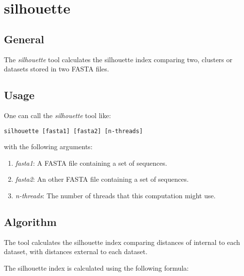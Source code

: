 \section{silhouette}

\subsection{General}

The \emph{silhouette} tool calculates the silhouette index comparing two,
clusters or datasets stored in two FASTA files.

\subsection{Usage}

One can call the \emph{silhouette} tool like:
\begin{lstlisting}
silhouette [fasta1] [fasta2] [n-threads]
\end{lstlisting}
with the following arguments:
\begin{enumerate}
\item \emph{fasta1}: A FASTA file containing a set of sequences.
\item \emph{fasta2}: An other FASTA file containing a set of sequences.
\item \emph{n-threads}: The number of threads that this computation might use.
\end{enumerate}

\subsection{Algorithm}

The tool calculates the silhouette index comparing distances of
internal to each dataset, with distances external to each dataset.

The silhouette index is calculated using the following formula:


